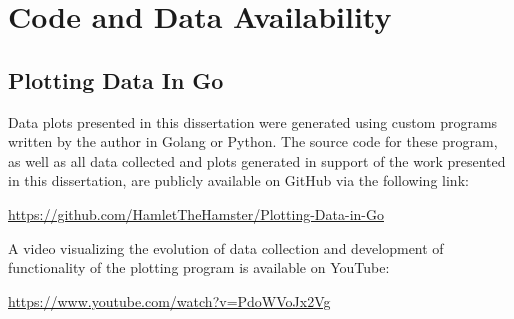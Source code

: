 \chapter{Code and Data Availability}
\label{appendix:CodeandDataAvailability}
\acresetall


%


\section{Plotting Data In Go}

Data plots presented in this dissertation were generated using custom programs written by the author in Golang or Python. The source code for these program, as well as all data collected and plots generated in support of the work presented in this dissertation, are publicly available on GitHub via the following link:

\hfill

\begin{center}
  \url{https://github.com/HamletTheHamster/Plotting-Data-in-Go}
\end{center}

\hfill

A video visualizing the evolution of data collection and development of functionality of the plotting program is available on YouTube:

\hfill

\begin{center}
  \url{https://www.youtube.com/watch?v=PdoWVoJx2Vg}
\end{center}

%
